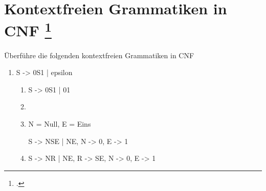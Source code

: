 \documentclass{lehramt-informatik-aufgabe}
\begin{document}
\let\schrittE=\liChomskyUeberErklaerung

\section{Kontextfreien Grammatiken in CNF
\footcite[Seite 37]{theo:fs:2}}

Überführe die folgenden kontextfreien Grammatiken in CNF

\begin{enumerate}


\item

\begin{liProduktionsRegeln}
S -> 0S1 | epsilon
\end{liProduktionsRegeln}

\begin{liAntwort}
\begin{enumerate}
\item \schrittE{1}

\begin{liProduktionsRegeln}
S -> 0S1 | 01
\end{liProduktionsRegeln}
\item \schrittE{2}

\liNichtsZuTun

\item \schrittE{3}

N = Null, E = Eins

\begin{liProduktionsRegeln}
S -> NSE | NE,
N -> 0,
E -> 1
\end{liProduktionsRegeln}

\item \schrittE{4}

\begin{liProduktionsRegeln}
S -> NR | NE,
R -> SE,
N -> 0,
E -> 1
\end{liProduktionsRegeln}
\end{enumerate}
\end{liAntwort}



\end{enumerate}
\end{document}
